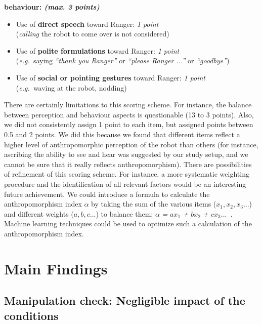 \documentclass{sig-alternate}
\newcommand{\eg}{{\textit{e.g.~}}}
\begin{document}
\textbf{behaviour: \textit{(max. 3 points)}}
\begin{itemize}
	\item Use of \textbf{direct speech} toward Ranger: \textit{1 point}\\
	(\textit{calling} the robot to come over is not considered)
	\item Use of \textbf{polite formulations} toward Ranger: \textit{1 point}\\ 
	(\eg saying \textit{``thank you Ranger''} or \textit{``please Ranger ...''} or \textit{``goodbye''})
	\item Use of \textbf{social or pointing gestures} toward Ranger: \textit{1 point}\\ 
	(\eg waving at the robot, nodding)
\end{itemize}

There are certainly limitations to this scoring scheme. For instance, the
balance between perception and behaviour aspects is questionable (13 to 3
points). Also, we did not consistently assign 1 point to each item, but assigned
points between 0.5 and 2 points. We did this because we found that different
items reflect a higher level of anthropomorphic perception of the robot than
others (for instance, ascribing the ability to see and hear was suggested by our
study setup, and we cannot be sure that it really reflects anthropomorphism).
There are possibilities of refinement of this scoring scheme. For instance, a
more systematic weighting procedure and the identification of all relevant
factors would be an interesting future achievement. We could introduce a formula
to calculate the anthropomorphism index \textit{$\alpha$} by taking the sum of
the various items ($x_1, x_2, x_3...$) and different weights ($a, b, c ...$) to
balance them: $\alpha$ \textit{=} $a x_1$ \textit{+} $b x_2$ \textit{+} $c x_3
...$~. Machine learning techniques could be used to optimize such a calculation
of the anthropomorphism index.



\section{Main Findings}

\subsection{Manipulation check: Negligible impact of the conditions}
\end{document}

